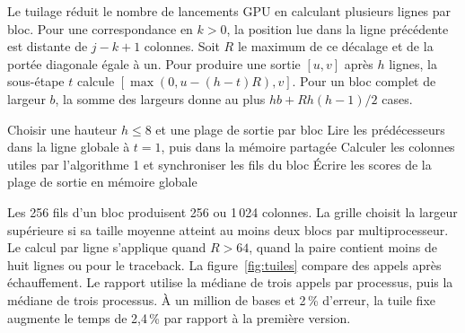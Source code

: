Le tuilage réduit le nombre de lancements GPU en calculant plusieurs lignes par bloc. Pour une correspondance en \(k>0\), la position lue dans la ligne précédente est distante de \(j-k+1\) colonnes. Soit \(R\) le maximum de ce décalage et de la portée diagonale égale à un. Pour produire une sortie \([u,v]\) après \(h\) lignes, la sous-étape \(t\) calcule \([\max(0,u-(h-t)R),v]\). Pour un bloc complet de largeur \(b\), la somme des largeurs donne au plus \(hb+Rh(h-1)/2\) cases.
\begin{algorithmic}[1]
\State Choisir une hauteur \(h\le8\) et une plage de sortie par bloc
\State Lire les prédécesseurs dans la ligne globale à \(t=1\), puis dans la mémoire partagée
\State Calculer les colonnes utiles par l'algorithme 1 et synchroniser les fils du bloc
\EndFor
\State Écrire les scores de la plage de sortie en mémoire globale
\end{algorithmic}
Les 256 fils d'un bloc produisent 256 ou 1\,024 colonnes. La grille choisit la largeur supérieure si sa taille moyenne atteint au moins deux blocs par multiprocesseur. Le calcul par ligne s'applique quand \(R>64\), quand la paire contient moins de huit lignes ou pour le traceback.
La figure~\ref{fig:tuiles} compare des appels après échauffement. Le rapport utilise la médiane de trois appels par processus, puis la médiane de trois processus. À un million de bases et 2\,\% d'erreur, la tuile fixe augmente le temps de 2,4\,\% par rapport à la première version.

